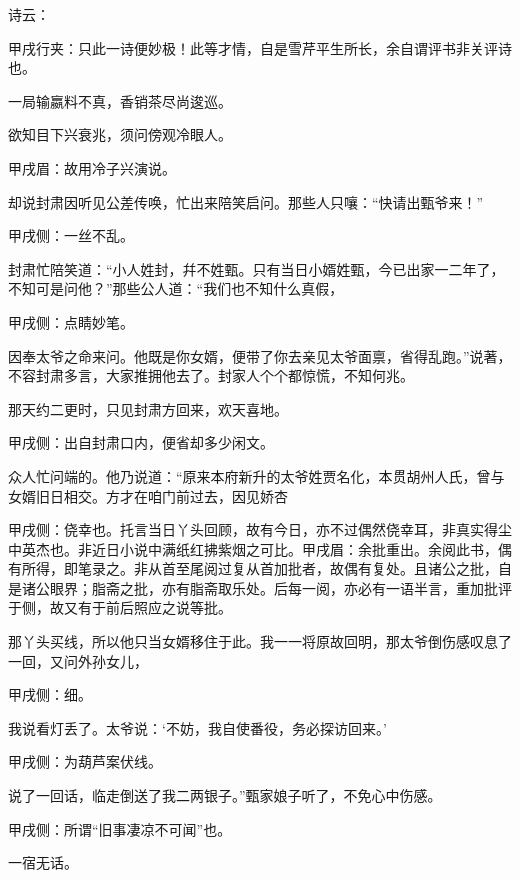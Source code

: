 \begin{parag}
    诗云：\begin{note}甲戌行夹：只此一诗便妙极！此等才情，自是雪芹平生所长，余自谓评书非关评诗也。\end{note}
\end{parag}


\begin{poem}
    \begin{pl}一局输嬴料不真，香销茶尽尚逡巡。\end{pl}

    \begin{pl}欲知目下兴衰兆，须问傍观冷眼人。\end{pl}\begin{note}甲戌眉：故用冷子兴演说。\end{note}
\end{poem}


\begin{parag}
    却说封肃因听见公差传唤，忙出来陪笑启问。那些人只嚷：“快请出甄爷来！”\begin{note}甲戌侧：一丝不乱。\end{note}封肃忙陪笑道：“小人姓封，幷不姓甄。只有当日小婿姓甄，今已出家一二年了，不知可是问他？”那些公人道：“我们也不知什么真假，\begin{note}甲戌侧：点睛妙笔。\end{note}因奉太爷之命来问。他既是你女婿，便带了你去亲见太爷面禀，省得乱跑。”说著，不容封肃多言，大家推拥他去了。封家人个个都惊慌，不知何兆。
\end{parag}


\begin{parag}
    那天约二更时，只见封肃方回来，欢天喜地。\begin{note}甲戌侧：出自封肃口内，便省却多少闲文。\end{note}众人忙问端的。他乃说道：“原来本府新升的太爷姓贾名化，本贯胡州人氏，曾与女婿旧日相交。方才在咱门前过去，因见娇杏\begin{note}甲戌侧：侥幸也。托言当日丫头回顾，故有今日，亦不过偶然侥幸耳，非真实得尘中英杰也。非近日小说中满纸红拂紫烟之可比。甲戌眉：余批重出。余阅此书，偶有所得，即笔录之。非从首至尾阅过复从首加批者，故偶有复处。且诸公之批，自是诸公眼界；脂斋之批，亦有脂斋取乐处。后每一阅，亦必有一语半言，重加批评于侧，故又有于前后照应之说等批。\end{note}那丫头买线，所以他只当女婿移住于此。我一一将原故回明，那太爷倒伤感叹息了一回，又问外孙女儿，\begin{note}甲戌侧：细。\end{note}我说看灯丢了。太爷说：‘不妨，我自使番役，务必探访回来。’\begin{note}甲戌侧：为葫芦案伏线。\end{note}说了一回话，临走倒送了我二两银子。”甄家娘子听了，不免心中伤感。\begin{note}甲戌侧：所谓“旧事凄凉不可闻”也。\end{note}一宿无话。
\end{parag}


